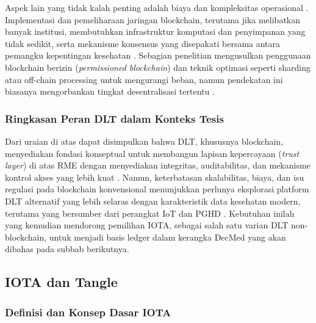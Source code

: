 Aspek lain yang tidak kalah penting adalah biaya dan kompleksitas operasional \parencite{Ettaloui_2024_blockchain_ehr_slr,Rawat2025_Blockchain_Secure_EHR}. 
Implementasi dan pemeliharaan jaringan blockchain, terutama jika melibatkan banyak institusi, membutuhkan infrastruktur komputasi dan penyimpanan yang tidak sedikit, serta mekanisme konsensus yang disepakati bersama antara pemangku kepentingan kesehatan \parencite{Yang_2021_blockchain_architecture_ehr}. 
Sebagian penelitian mengusulkan penggunaan blockchain berizin (\emph{permissioned blockchain}) dan teknik optimasi seperti sharding atau off-chain processing untuk mengurangi beban, namun pendekatan ini biasanya mengorbankan tingkat desentralisasi tertentu \parencite{Mayer_2020_ehr_blockchain_slr}. 

\subsubsection{Ringkasan Peran DLT dalam Konteks Tesis}

Dari uraian di atas dapat disimpulkan bahwa DLT, khususnya blockchain, menyediakan fondasi konseptual untuk membangun lapisan kepercayaan (\emph{trust layer}) di atas RME dengan menyediakan integritas, auditabilitas, dan mekanisme kontrol akses yang lebih kuat \parencite{Ettaloui_2024_blockchain_ehr_slr,Mayer_2020_ehr_blockchain_slr}. 
Namun, keterbatasan skalabilitas, biaya, dan isu regulasi pada blockchain konvensional menunjukkan perlunya eksplorasi platform DLT alternatif yang lebih selaras dengan karakteristik data kesehatan modern, terutama yang bersumber dari perangkat IoT dan PGHD \parencite{Ettaloui_2024_blockchain_ehr_slr}. 
Kebutuhan inilah yang kemudian mendorong pemilihan IOTA, sebagai salah satu varian DLT non-blockchain, untuk menjadi basis ledger dalam kerangka DecMed yang akan dibahas pada subbab berikutnya.

\subsection{IOTA dan Tangle}

\subsubsection{Definisi dan Konsep Dasar IOTA}

